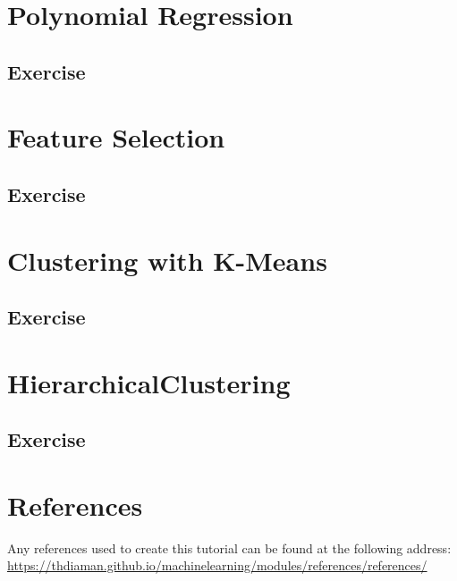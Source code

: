 \documentclass[10pt,twoside,a4paper,openany]{memoir}
\renewcommand*{\printchaptertitle}[1]{\vspace{-2.5cm}\chaptitlefont\thechapter.\ ##1\vspace{-1cm}}
\begin{document}
\chapter{Polynomial Regression}

\section{Exercise}



\chapter{Feature Selection}

\section{Exercise}



\chapter{Clustering with K-Means}

\section{Exercise}



\chapter{HierarchicalClustering}

\section{Exercise}



\backmatter

\renewcommand*{\printchaptertitle}[1]{\chaptitlefont#1}
\chapter*{References}
Any references used to create this tutorial can be found at the following address:\\
\href{https://thdiaman.github.io/machinelearning/modules/references/references/}{https://thdiaman.github.io/machinelearning/modules/references/references/}
\end{document}
